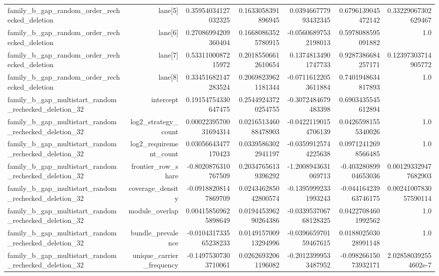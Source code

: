{\begin{longtable}{lrrrrrr}
family\_b\_gap\_random\_order\_rechecked\_deletion & lane[5] & 0.35954034127032325 & 0.1633058391896945 & 0.039466777993432345 & 0.6796139045472142 & 0.33229067302629467 \\
family\_b\_gap\_random\_order\_rechecked\_deletion & lane[6] & 0.27086994209360404 & 0.16680863525780915 & -0.05606897532198013 & 0.5978088595091882 & 1.0 \\
family\_b\_gap\_random\_order\_rechecked\_deletion & lane[7] & 0.5331100087215972 & 0.20185506612610654 & 0.13748134901747733 & 0.9287386684257171 & 0.12397303714905772 \\
family\_b\_gap\_random\_order\_rechecked\_deletion & lane[8] & 0.33451682147283524 & 0.20698239621181344 & -0.07116122053611884 & 0.7401948634817893 & 1.0 \\
family\_b\_gap\_multistart\_random\_rechecked\_deletion\_32 & intercept & 0.19154754330647475 & 0.25449243720254755 & -0.3072484679483398 & 0.6903435545612894 &  \\
family\_b\_gap\_multistart\_random\_rechecked\_deletion\_32 & log2\_strategy\_count & 0.0002239570031694314 & 0.021651346088478903 & -0.04221190154706139 & 0.04265981555340026 & 1.0 \\
family\_b\_gap\_multistart\_random\_rechecked\_deletion\_32 & log2\_requirement\_count & 0.03056643477170423 & 0.03395863022941197 & -0.03599125744225638 & 0.09712412698566485 & 1.0 \\
family\_b\_gap\_multistart\_random\_rechecked\_deletion\_32 & frontier\_row\_share & -0.8020876310767509 & 0.20347656139396292 & -1.2008943631069713 & -0.40328089904653036 & 0.001293329477682903 \\
family\_b\_gap\_multistart\_random\_rechecked\_deletion\_32 & coverage\_density & -0.09188208147869709 & 0.024346285042800574 & -0.13959992331993243 & -0.04416423963746175 & 0.0024100783057590114 \\
family\_b\_gap\_multistart\_random\_rechecked\_deletion\_32 & module\_overlap & 0.004158569625898649 & 0.019445396290264386 & -0.033953706768128325 & 0.04227084601992562 & 1.0 \\
family\_b\_gap\_multistart\_random\_rechecked\_deletion\_32 & bundle\_prevalence & -0.010431733565238233 & 0.014915700913294996 & -0.039665970159467615 & 0.018802503028991148 & 1.0 \\
family\_b\_gap\_multistart\_random\_rechecked\_deletion\_32 & unique\_carrier\_frequency & -0.14975307303710061 & 0.02626932061196082 & -0.20123999533487952 & -0.09826615073932171 & 2.028580392554602e-7 \\

\end{longtable}}

